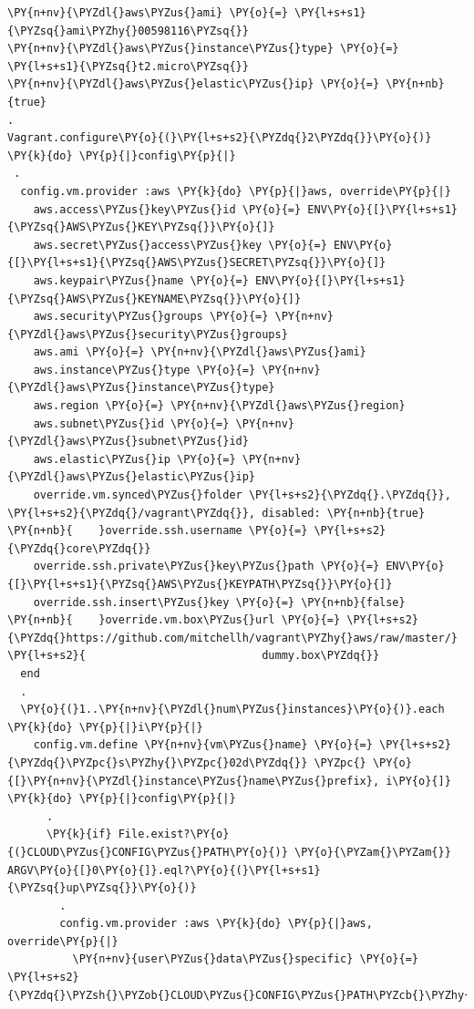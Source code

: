 \begin{codelisting}
\begin{Verbatim}[fontsize=\relsize{-2.5},fontseries=b,commandchars=\\\{\}]
\PY{n+nv}{\PYZdl{}aws\PYZus{}ami} \PY{o}{=} \PY{l+s+s1}{\PYZsq{}ami\PYZhy{}00598116\PYZsq{}}
\PY{n+nv}{\PYZdl{}aws\PYZus{}instance\PYZus{}type} \PY{o}{=} \PY{l+s+s1}{\PYZsq{}t2.micro\PYZsq{}}
\PY{n+nv}{\PYZdl{}aws\PYZus{}elastic\PYZus{}ip} \PY{o}{=} \PY{n+nb}{true}
.
Vagrant.configure\PY{o}{(}\PY{l+s+s2}{\PYZdq{}2\PYZdq{}}\PY{o}{)} \PY{k}{do} \PY{p}{|}config\PY{p}{|}
 .
  config.vm.provider :aws \PY{k}{do} \PY{p}{|}aws, override\PY{p}{|}
    aws.access\PYZus{}key\PYZus{}id \PY{o}{=} ENV\PY{o}{[}\PY{l+s+s1}{\PYZsq{}AWS\PYZus{}KEY\PYZsq{}}\PY{o}{]}
    aws.secret\PYZus{}access\PYZus{}key \PY{o}{=} ENV\PY{o}{[}\PY{l+s+s1}{\PYZsq{}AWS\PYZus{}SECRET\PYZsq{}}\PY{o}{]}
    aws.keypair\PYZus{}name \PY{o}{=} ENV\PY{o}{[}\PY{l+s+s1}{\PYZsq{}AWS\PYZus{}KEYNAME\PYZsq{}}\PY{o}{]}
    aws.security\PYZus{}groups \PY{o}{=} \PY{n+nv}{\PYZdl{}aws\PYZus{}security\PYZus{}groups}
    aws.ami \PY{o}{=} \PY{n+nv}{\PYZdl{}aws\PYZus{}ami}
    aws.instance\PYZus{}type \PY{o}{=} \PY{n+nv}{\PYZdl{}aws\PYZus{}instance\PYZus{}type}
    aws.region \PY{o}{=} \PY{n+nv}{\PYZdl{}aws\PYZus{}region}
    aws.subnet\PYZus{}id \PY{o}{=} \PY{n+nv}{\PYZdl{}aws\PYZus{}subnet\PYZus{}id}
    aws.elastic\PYZus{}ip \PY{o}{=} \PY{n+nv}{\PYZdl{}aws\PYZus{}elastic\PYZus{}ip}
    override.vm.synced\PYZus{}folder \PY{l+s+s2}{\PYZdq{}.\PYZdq{}}, \PY{l+s+s2}{\PYZdq{}/vagrant\PYZdq{}}, disabled: \PY{n+nb}{true}
\PY{n+nb}{    }override.ssh.username \PY{o}{=} \PY{l+s+s2}{\PYZdq{}core\PYZdq{}}
    override.ssh.private\PYZus{}key\PYZus{}path \PY{o}{=} ENV\PY{o}{[}\PY{l+s+s1}{\PYZsq{}AWS\PYZus{}KEYPATH\PYZsq{}}\PY{o}{]}
    override.ssh.insert\PYZus{}key \PY{o}{=} \PY{n+nb}{false}
\PY{n+nb}{    }override.vm.box\PYZus{}url \PY{o}{=} \PY{l+s+s2}{\PYZdq{}https://github.com/mitchellh/vagrant\PYZhy{}aws/raw/master/}
\PY{l+s+s2}{                           dummy.box\PYZdq{}}
  end
  .
  \PY{o}{(}1..\PY{n+nv}{\PYZdl{}num\PYZus{}instances}\PY{o}{)}.each \PY{k}{do} \PY{p}{|}i\PY{p}{|}
    config.vm.define \PY{n+nv}{vm\PYZus{}name} \PY{o}{=} \PY{l+s+s2}{\PYZdq{}\PYZpc{}s\PYZhy{}\PYZpc{}02d\PYZdq{}} \PYZpc{} \PY{o}{[}\PY{n+nv}{\PYZdl{}instance\PYZus{}name\PYZus{}prefix}, i\PY{o}{]} \PY{k}{do} \PY{p}{|}config\PY{p}{|}
      .
      \PY{k}{if} File.exist?\PY{o}{(}CLOUD\PYZus{}CONFIG\PYZus{}PATH\PY{o}{)} \PY{o}{\PYZam{}\PYZam{}} ARGV\PY{o}{[}0\PY{o}{]}.eql?\PY{o}{(}\PY{l+s+s1}{\PYZsq{}up\PYZsq{}}\PY{o}{)}
        .
        config.vm.provider :aws \PY{k}{do} \PY{p}{|}aws, override\PY{p}{|}   
          \PY{n+nv}{user\PYZus{}data\PYZus{}specific} \PY{o}{=} \PY{l+s+s2}{\PYZdq{}\PYZsh{}\PYZob{}CLOUD\PYZus{}CONFIG\PYZus{}PATH\PYZcb{}\PYZhy{}\PYZsh{}\PYZob{}i\PYZcb{}\PYZdq{}}

\end{Verbatim}
\end{codelisting}
